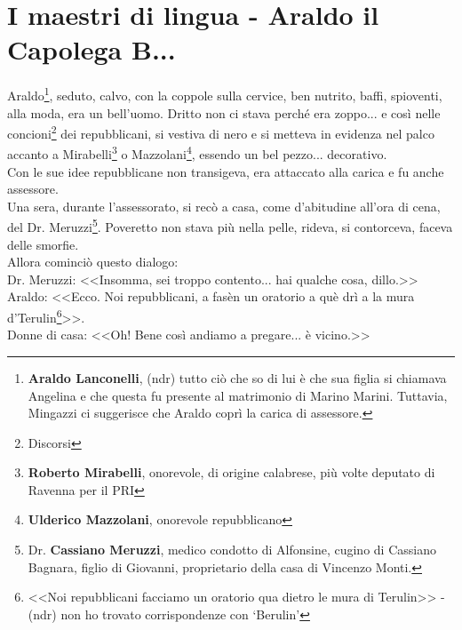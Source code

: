 %
\chapter{I maestri di lingua - Araldo il Capolega B...}
Araldo\footnote{\textbf{Araldo Lanconelli}, (ndr) tutto ciò che so di lui è che sua figlia si chiamava Angelina e che questa fu presente al matrimonio di Marino Marini. Tuttavia, Mingazzi ci suggerisce che Araldo coprì la carica di assessore.}, seduto, calvo, con la coppole sulla cervice, ben nutrito, baffi, spioventi, alla moda, era un bell'uomo. Dritto non ci stava perché era zoppo... e così nelle concioni\footnote{Discorsi} dei repubblicani, si vestiva di nero e si metteva in evidenza nel palco accanto a Mirabelli\footnote{\textbf{Roberto Mirabelli}, onorevole, di origine calabrese, più volte deputato di Ravenna per il PRI} o Mazzolani\footnote{\textbf{Ulderico Mazzolani}, onorevole repubblicano}, essendo un bel pezzo... decorativo.\\
\indent Con le sue idee repubblicane non transigeva, era attaccato alla carica e fu anche assessore.\\
\indent Una sera, durante l'assessorato, si recò a casa, come d'abitudine all'ora di cena, del Dr. Meruzzi\footnote{Dr. \textbf{Cassiano Meruzzi}, medico condotto di Alfonsine, cugino di Cassiano Bagnara, figlio di Giovanni, proprietario della casa di Vincenzo Monti.}. Poveretto non stava più nella pelle, rideva, si contorceva, faceva delle smorfie.\\
\indent Allora cominciò questo dialogo:\\
\indent Dr. Meruzzi: <<Insomma, sei troppo contento... hai qualche cosa, dillo.>>\\
\indent {}Araldo: <<Ecco. Noi repubblicani, a fasèn un oratorio a què drì a la mura d'Terulin\footnote{<<Noi repubblicani facciamo un oratorio qua dietro le mura di Terulin>> - (ndr) non ho trovato corrispondenze con `Berulin'}>>.\\
\indent Donne di casa: <<Oh! Bene così andiamo a pregare... è vicino.>>\\

